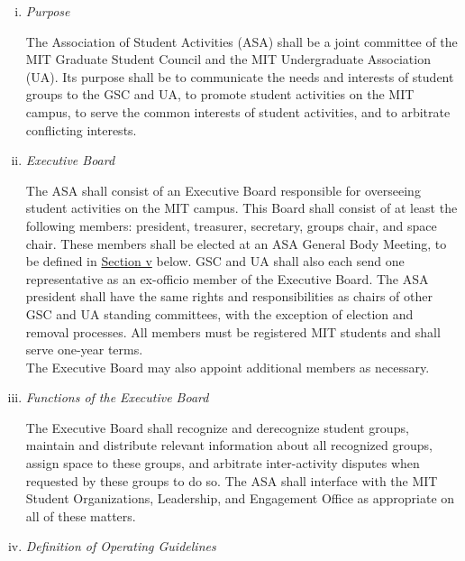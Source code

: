 \documentclass[12pt]{constitution}
\begin{document}
\begin{enumerate}[i.]
\item \textit{Purpose}

The Association of Student Activities (ASA) shall be a joint committee of the MIT Graduate Student Council and
    the MIT Undergraduate Association (UA).
Its purpose shall be to communicate the needs and interests of student groups to the GSC and UA, to promote
    student activities on the MIT campus, to serve the common interests of student activities, and to
    arbitrate conflicting interests.

\item \textit{Executive Board}

The ASA shall consist of an Executive Board responsible for overseeing student activities on the MIT campus.
This Board shall consist of at least the following members: president, treasurer, secretary, groups chair, and space chair.
These members shall be elected at an ASA General Body Meeting, to be defined in \hyperref[gbms]{Section v} below.
GSC and UA shall also each send one representative as an ex-officio member of the Executive Board.
The ASA president shall have the same rights and responsibilities as chairs of other GSC and UA standing committees,
    with the exception of election and removal processes.
All members must be registered MIT students and shall serve one-year terms.
\\

The Executive Board may also appoint additional members as necessary.

\item \textit{Functions of the Executive Board}

The Executive Board shall recognize and derecognize student groups, maintain and distribute relevant information
    about all recognized groups, assign space to these groups, and arbitrate inter-activity disputes when requested
    by these groups to do so.
The ASA shall interface with the MIT Student Organizations, Leadership, and Engagement Office as appropriate
    on all of these matters.

\item \textit{Definition of Operating Guidelines}
\label{gsc_bylaws:5iv}


\end{enumerate}
\end{document}
